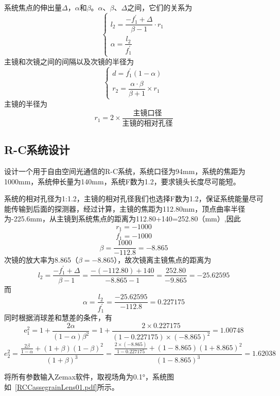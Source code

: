 系统焦点的伸出量$ \Delta $，$ \alpha $和$ \beta $。$ \alpha $、$ \beta $、$ \Delta $之间，它们的关系为
\begin{equation*}
\left\{ 
\begin{array}{l}  
	l_2 = \dfrac{-f_{1}^{'}+\Delta}{\beta -1}\cdot r_1 
	\\
	\alpha = \dfrac{l_2}{f_1 ^{'}}
\end{array}
\right.  
\end{equation*}
主镜和次镜之间的间隔以及次镜的半径为
\begin{equation*}
\left\{  \begin{array}{l}   d = f_1^{'}(1-\alpha) \\
	 r_2 = \dfrac{\alpha \cdot \beta}{\beta + 1}\times r_1 \end{array} \right.
\end{equation*}
主镜的半径为
$$r_1 = 2 \times \dfrac{\text{主镜口径}}{\text{主镜的相对孔径}}$$

\subsection{R-C系统设计}
设计一个用于自由空间光通信的R-C系统，系统口径为94mm，系统的焦距为1000mm，系统伸长量为140mm，系统F数为1.2，要求镜头长度尽可能短。

系统的相对孔径为1:1.2，主镜的相对孔径我们也选择F数为1.2，保证系统能量尽可能传输到后面的探测器，经过计算，主镜的焦距为112.80mm，顶点曲率半径为-225.6mm，从主镜到系统焦点的距离为112.80+140=252.80（mm）,因此
$$ r_1=-1000 $$
$$ f_1 ^{'}=-1000 $$
$$
\beta=\dfrac{1000}{-112.8}=-8.865
$$
次镜的放大率为8.865（$\beta = - 8.865$），故次镜离主镜焦点的距离为
$$ l _ { 2 } = \frac { - f _ { 1 } ^ { \prime } + \Delta } { \beta - 1 } = \frac { - ( - 112.80 ) + 140 } { - 8.865 - 1 } = \frac { 252.80 } { - 9.865 } = - 25.62595 $$
而
$$ \alpha = \frac { l _ { 2 } } { f _ { 1 } ^ { \prime } } = \frac { - 25.62595 } { - 112.8 } =0.227175 $$
同时根据消球差和慧差的条件，有
$$ \mathrm { e } _ { 1 } ^ { 2 } = 1 + \frac { 2 \alpha } { ( 1 - \alpha ) \beta ^ { 2 } } = 1 + \frac { 2 \times 0.227175 } { ( 1 - 0.227175 ) \times ( - 8.865 ) ^ { 2 } } = 1.00748 $$
$$ e _ { 2 } ^ { 2 } = \frac { \frac { 2 \beta } { 1 - \alpha } + ( 1 + \beta ) ( 1 - \beta ) ^ { 2 } } { ( 1 + \beta ) ^ { 3 } } = \frac { \frac { 2 \times ( - 8.865 ) } { 1 - 0.227175 } + ( 1 - 8.865 ) ( 1 + 8.865 ) ^ { 2 } } { ( 1 - 8.865 ) ^ { 3 } } =1.62038 $$

将所有参数输入Zemax软件，取视场角为0.1°，系统图如~\ref{RCCassegrainLens01.pdf}所示。


